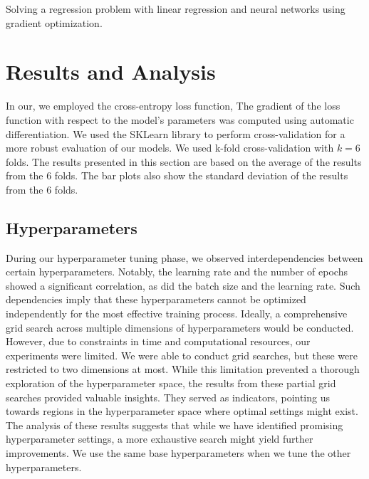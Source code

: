 \documentclass[twoside,11pt]{report}
\begin{document}
    Solving a regression problem with linear regression and neural networks using gradient optimization.



\section*{Results and Analysis}
\label{sec:resultsdiscussion2}


    In our, we employed the cross-entropy loss function, The gradient of the loss function 
    with respect to the model's parameters was computed using automatic differentiation. 
    We used the SKLearn\cite{scikit-learn}
    library to perform cross-validation for a more robust evaluation of our models.
    We used k-fold cross-validation with $k=6$ folds. The results presented in this section are based on
    the average of the results from the 6 folds. The bar plots also show the standard deviation of the
    results from the 6 folds.




\subsection*{Hyperparameters}
\label{sec:hyperparameters2}

    During our hyperparameter tuning phase, we observed interdependencies between certain hyperparameters. Notably, 
    the learning rate and the number of epochs showed a significant correlation, as did the batch size and the learning 
    rate. Such dependencies imply that these hyperparameters cannot be optimized independently for the most effective 
    training process. Ideally, a comprehensive grid search across multiple dimensions of hyperparameters would be 
    conducted. However, due to constraints in time and computational resources, our experiments were limited.
    We were able to conduct grid searches, but these were restricted to two dimensions at most. While this limitation 
    prevented a thorough exploration of the hyperparameter space, the results from these partial grid searches provided 
    valuable insights. They served as indicators, pointing us towards regions in the hyperparameter space where optimal 
    settings might exist.
    The analysis of these results suggests that while we have identified promising hyperparameter settings, a more 
    exhaustive search might yield further improvements. 
    We use the same base hyperparameters when we tune the other hyperparameters.
\end{document}

